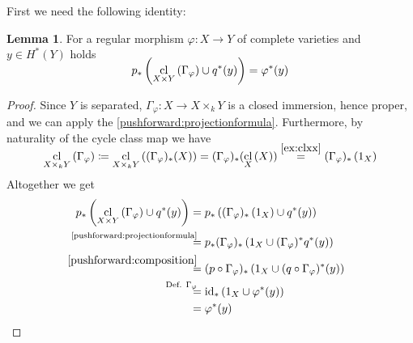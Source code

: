 \documentclass[english,headsepline=0.25pt]{scrartcl}
\theoremstyle{definition}
\newtheorem{Lem}[Def]{Lemma}
\theoremstyle{remark}
\newcommand*{\id}{\text{id}} %
\newcommand*{\Graph}[1]{{\Gamma_{#1}}} %
\DeclareMathOperator{\CL}{cl} %
\newcommand*{\cl}[2]{{\CL_{#1}\left(#2\right)}} %
\newcommand*{\one}[1]{{1_{#1}}}%
\renewcommand*{\phi}{\varphi}
\begin{document}
    First we need the following identity:
    \begin{Lem}\label{step1}
      For a regular morphism $\phi\colon X\to Y$ of complete varieties
      and $y\in H^*(Y)$ holds
      \begin{gather*}
        \SwapAboveDisplaySkip
        p_*\left(\cl{X\times Y}{\Graph{\phi}} \cup q^*(y)\right)
        = \phi^*(y)           
      \end{gather*}
      \begin{proof}
        Since $Y$ is separated, $\Graph{\phi}\colon X\to X\times_k Y$
        is a closed immersion, hence proper, and we can apply the
        \ref{pushforward:projectionformula}.
        Furthermore, by naturality of the cycle class map we have
        \begin{gather}
          \SwapAboveDisplaySkip
          \cl{X\times_k Y}{\Graph{\phi}} \coloneqq
          \cl{X\times_k Y}{(\Graph{\phi})_*(X)} =
          (\Graph{\phi})_*(\cl{X}{X}) \overset{\ref{ex:clxx}}{=} %
          (\Graph{\phi})_*\left(\one{X}\right)
        \end{gather}
        Altogether we get
        \begin{align*}
          p_*\left(\cl{X\times Y}{\Graph{\phi}} \cup q^*(y)\right)
          &=  p_*\left(
            (\Graph{\phi})_*\left(\one{X}\right) \cup q^*(y)
            \right)\\
          &\overset{\mathllap{\text{\ref{pushforward:projectionformula}}}}{=}
            p_*(\Graph{\phi})_*\left( \one{X} \cup (\Graph{\phi})^*q^*(y) \right)\\
          &\overset{\mathllap{\ref{pushforward:composition}}}=
            (p\circ\Graph{\phi})_* \left(
            \one{X} \cup (q\circ\Graph{\phi})^*(y) \right)\\
          &\overset{\mathllap{\text{Def. $\Graph\phi$}}}=
            \id_* \left( \one{X} \cup \phi^*(y) \right)\\
          &= \phi^*(y)
        \end{align*}
      \end{proof}
    \end{Lem}
\end{document}
